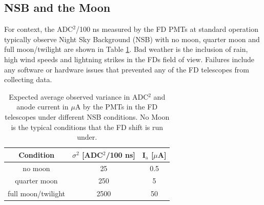 \subsection{NSB and the Moon}
For context, the ADC$^2$/100 ns measured by the FD PMTs at standard operation typically observe Night Sky Background (NSB) with no moon, quarter moon and full moon/twilight are shown in Table \ref{tab:MoonLightADC}. Bad weather is the inclusion of rain, high wind speeds and lightning strikes in the FDs field of view. Failures include any software or hardware issues that prevented any of the FD telescopes from collecting data.
\begin{table}[h]
\centering
\begin{tabular}{c c c}
\hline\hline
Condition & $\sigma^2$ [ADC$^2$/100 ns] & I$_{\mathrm{a}}$ [$\mu$A] \\ \hline\hline
no moon & 25 & 0.5 \\
quarter moon & 250 & 5 \\
full moon/twilight & 2500 & 50 \\ 
\hline\hline
\end{tabular}
\caption{Expected average observed variance in ADC$^2$ and anode current in $\mu$A by the PMTs in the FD telescopes under different NSB conditions. No Moon is the typical conditions that the FD shift is run under.  } \label{tab:MoonLightADC}
\end{table}

